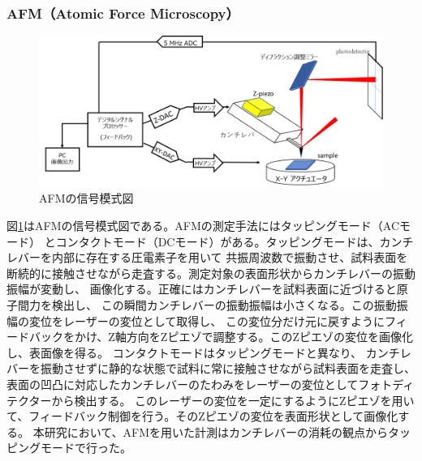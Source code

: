 \documentclass[dvipdfmx,12pt,a4paper]{jreport}
\begin{document}
		\subsubsection{AFM（Atomic Force Microscopy）}
		\begin{figure}[h]
			\centering
			\includegraphics[width=0.8\linewidth]{AFM.png}
			\caption{AFMの信号模式図}
			\label{stracture_of_AFM}
		\end{figure}
		図\ref{stracture_of_AFM}はAFMの信号模式図である。AFMの測定手法にはタッピングモード（ACモード）
		とコンタクトモード（DCモード）がある。タッピングモードは、カンチレバーを内部に存在する圧電素子を用いて
		共振周波数で振動させ、試料表面を断続的に接触させながら走査する。測定対象の表面形状からカンチレバーの振動振幅が変動し、
		画像化する。正確にはカンチレバーを試料表面に近づけると原子間力を検出し、
		この瞬間カンチレバーの振動振幅は小さくなる。この振動振幅の変位をレーザーの変位として取得し、
		この変位分だけ元に戻すようにフィードバックをかけ、Z軸方向をZピエゾで調整する。このZピエゾの変位を画像化し、表面像を得る。
		コンタクトモードはタッピングモードと異なり、
		カンチレバーを振動させずに静的な状態で試料に常に接触させながら試料表面を走査し、
		表面の凹凸に対応したカンチレバーのたわみをレーザーの変位としてフォトディテクターから検出する。
		このレーザーの変位を一定にするようにZピエゾを用いて、フィードバック制御を行う。そのZピエゾの変位を表面形状として画像化する。
		本研究において、AFMを用いた計測はカンチレバーの消耗の観点からタッピングモードで行った。
\end{document}
